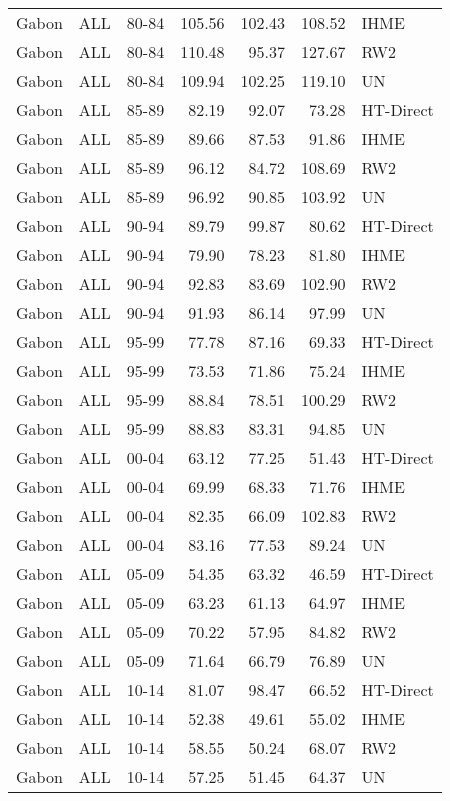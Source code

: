 \begin{longtable}{lllrrrl}
  Gabon & ALL & 80-84 & 105.56 & 102.43 & 108.52 & IHME \\ 
  Gabon & ALL & 80-84 & 110.48 & 95.37 & 127.67 & RW2 \\ 
  Gabon & ALL & 80-84 & 109.94 & 102.25 & 119.10 & UN \\ 
  Gabon & ALL & 85-89 & 82.19 & 92.07 & 73.28 & HT-Direct \\ 
  Gabon & ALL & 85-89 & 89.66 & 87.53 & 91.86 & IHME \\ 
  Gabon & ALL & 85-89 & 96.12 & 84.72 & 108.69 & RW2 \\ 
  Gabon & ALL & 85-89 & 96.92 & 90.85 & 103.92 & UN \\ 
  Gabon & ALL & 90-94 & 89.79 & 99.87 & 80.62 & HT-Direct \\ 
  Gabon & ALL & 90-94 & 79.90 & 78.23 & 81.80 & IHME \\ 
  Gabon & ALL & 90-94 & 92.83 & 83.69 & 102.90 & RW2 \\ 
  Gabon & ALL & 90-94 & 91.93 & 86.14 & 97.99 & UN \\ 
  Gabon & ALL & 95-99 & 77.78 & 87.16 & 69.33 & HT-Direct \\ 
  Gabon & ALL & 95-99 & 73.53 & 71.86 & 75.24 & IHME \\ 
  Gabon & ALL & 95-99 & 88.84 & 78.51 & 100.29 & RW2 \\ 
  Gabon & ALL & 95-99 & 88.83 & 83.31 & 94.85 & UN \\ 
  Gabon & ALL & 00-04 & 63.12 & 77.25 & 51.43 & HT-Direct \\ 
  Gabon & ALL & 00-04 & 69.99 & 68.33 & 71.76 & IHME \\ 
  Gabon & ALL & 00-04 & 82.35 & 66.09 & 102.83 & RW2 \\ 
  Gabon & ALL & 00-04 & 83.16 & 77.53 & 89.24 & UN \\ 
  Gabon & ALL & 05-09 & 54.35 & 63.32 & 46.59 & HT-Direct \\ 
  Gabon & ALL & 05-09 & 63.23 & 61.13 & 64.97 & IHME \\ 
  Gabon & ALL & 05-09 & 70.22 & 57.95 & 84.82 & RW2 \\ 
  Gabon & ALL & 05-09 & 71.64 & 66.79 & 76.89 & UN \\ 
  Gabon & ALL & 10-14 & 81.07 & 98.47 & 66.52 & HT-Direct \\ 
  Gabon & ALL & 10-14 & 52.38 & 49.61 & 55.02 & IHME \\ 
  Gabon & ALL & 10-14 & 58.55 & 50.24 & 68.07 & RW2 \\ 
  Gabon & ALL & 10-14 & 57.25 & 51.45 & 64.37 & UN \\ 

\end{longtable}
